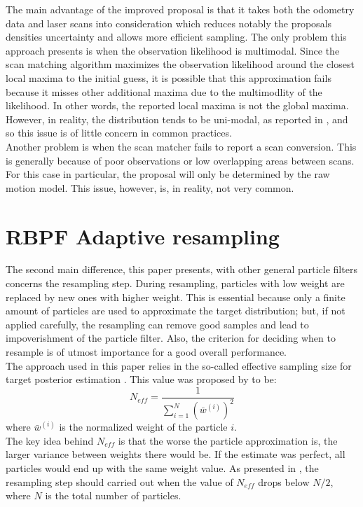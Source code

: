 \documentclass[letterpaper]{article}
\begin{document}
The main advantage of the improved proposal is that it takes both the odometry data and laser scans into consideration which reduces notably the proposals densities uncertainty and allows more efficient sampling. The only problem this approach presents is when the observation likelihood is multimodal. Since the scan matching algorithm maximizes the observation likelihood around the closest local maxima to the initial guess, it is possible that this approximation fails because it misses other additional maxima due to the multimodlity of the likelihood. In other words, the reported local maxima is not the global maxima. However, in reality, the distribution tends to be uni-modal, as reported in \cite{Cyrill}, and so this issue is of little concern in common practices.\\
Another problem is when the scan matcher fails to report a scan conversion. This is generally because of poor observations or low overlapping areas between scans. For this case in particular, the proposal will only be determined by the raw motion model. This issue, however, is, in reality, not very common.

\section{RBPF Adaptive resampling}

The second main difference, this paper presents, with other general particle filters concerns the resampling step. During resampling, particles with low weight are replaced by new ones with higher weight. This is essential because only a finite amount of particles are used to approximate the target distribution; but, if not applied carefully, the resampling can remove good samples and lead to impoverishment of the particle filter. Also, the criterion for deciding when to resample is of utmost importance for a good overall performance.\\
The approach used in this paper relies in the so-called effective sampling size for target posterior estimation \cite{Liu}. This value was proposed by \cite{Weights} to be:
\begin{equation}
N_{eff}= \frac{1}{\sum_{i=1}^N (\bar w^{(i)})^2}
\end{equation}
where $\bar w^{(i)}$ is the normalized weight of the particle $i$.\\
The key idea behind $N_{eff}$ is that the worse the particle approximation is, the larger variance between weights there would be.  If the estimate was perfect, all particles would end up with the same weight value. As presented in \cite{Cyrill}, the resampling step should carried out when the value of $N_{eff}$ drops below $N/2$, where $N$ is the total number of particles.
\end{document}
